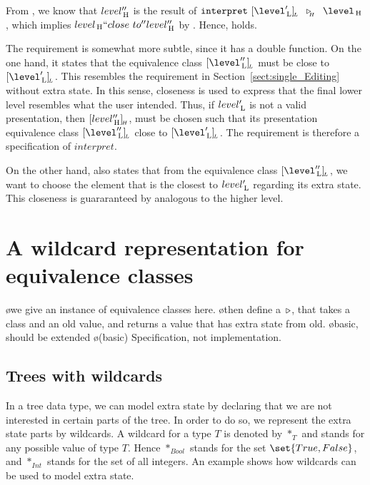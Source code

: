 From , we know that $level''_{\, \mathrm H}$ is the result of  $\interpret~ \eqcl{\level'\L}{L}  ~\reuze{H}~   \level\H$, which implies $level_{\, \mathrm H} ``close~to'' level''_{\, \mathrm H}$ by . Hence,  holds.

The  requirement is somewhat more subtle, since it has a double function. On the one hand, it states that the equivalence class $\eqcl{\level''\L}{L}$ must be close to $\eqcl{\level'\L}{L}$. This resembles the  requirement in Section~\ref{sect:single_Editing} without extra state. In this sense, closeness is used to express that the final lower level resembles what the user intended. Thus, if $level'_{\, \mathrm L}$ is not a valid presentation, then $[{level''_{\, \mathrm H}}]_{{\!_{H}}}$, must be chosen such that its presentation equivalence class $\eqcl{\level''\L}{L}$ close to $\eqcl{\level'\L}{L}$. The requirement is therefore a specification of $interpret$.


On the other hand,  also states that from the equivalence class $\eqcl{\level''\L}{L}$,
 we want to choose the element that is the closest to $level'_{\, \mathrm L}$ regarding its extra state. This closeness is guararanteed by  analogous to the higher level.



%																
%																
%																
\section{A wildcard representation for equivalence classes} \label{sect:wildcardEq}

\bl
\o we give an instance of equivalence classes here.
\o then define a~$\triangleright$, that takes a class and an old value, and returns a value that has extra state from old.
\o basic, should be extended
\o (basic) Specification, not implementation. 
\el

%

\fromHere

\subsection{Trees with wildcards}
In a tree data type, we can model extra state by declaring that we are not interested in certain parts of the tree. In order to do so, we represent the extra state parts by wildcards. A wildcard for a type $T$ is denoted by $*_T$ and stands for any possible value of type $T$. Hence $*_{Bool}$ stands for the set $\set{True, False}$, and $*_{Int}$ stands for the set of all integers. An example shows how wildcards can be used to model extra state.

